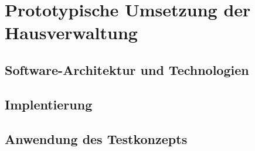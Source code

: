 \section{Prototypische Umsetzung der Hausverwaltung}\label{Prototypische Umsetzung der Hausverwaltung}

\subsection{Software-Architektur und Technologien}



\subsection{Implentierung}


\subsection{Anwendung des Testkonzepts}

